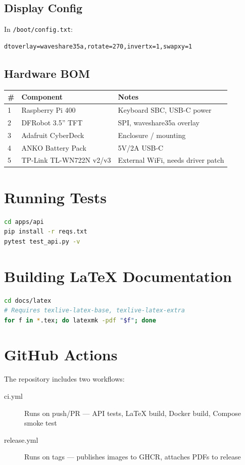 \documentclass[11pt,a4paper]{article}
\begin{document}
\subsection{Display Config}
In \texttt{/boot/config.txt}:
\begin{lstlisting}
dtoverlay=waveshare35a,rotate=270,invertx=1,swapxy=1
\end{lstlisting}

\subsection{Hardware BOM}
\begin{tabular}{lll}
\toprule
\textbf{\#} & \textbf{Component} & \textbf{Notes} \\
\midrule
1 & Raspberry Pi 400        & Keyboard SBC, USB-C power \\
2 & DFRobot 3.5'' TFT       & SPI, waveshare35a overlay \\
3 & Adafruit CyberDeck      & Enclosure / mounting \\
4 & ANKO Battery Pack        & 5V/2A USB-C \\
5 & TP-Link TL-WN722N v2/v3 & External WiFi, needs driver patch \\
\bottomrule
\end{tabular}

\section{Running Tests}
\begin{lstlisting}[language=bash]
cd apps/api
pip install -r reqs.txt
pytest test_api.py -v
\end{lstlisting}

\section{Building LaTeX Documentation}
\begin{lstlisting}[language=bash]
cd docs/latex
# Requires texlive-latex-base, texlive-latex-extra
for f in *.tex; do latexmk -pdf "$f"; done
\end{lstlisting}

\section{GitHub Actions}
The repository includes two workflows:
\begin{description}
  \item[ci.yml] Runs on push/PR --- API tests, LaTeX build, Docker build, Compose smoke test
  \item[release.yml] Runs on tags --- publishes images to GHCR, attaches PDFs to release
\end{description}
\end{document}
